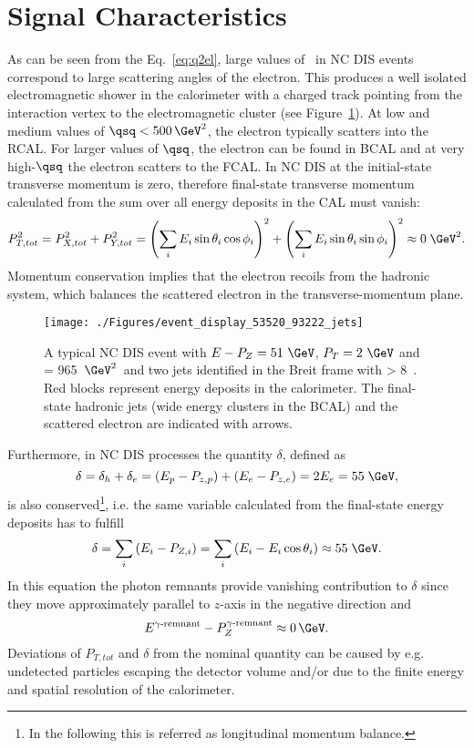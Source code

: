 \section{Signal Characteristics}
\label{sec:signalchar}
As can be seen from the Eq.~\eqref{eq:q2el}, large values of \qsq\, in NC DIS events correspond to large scattering angles of the electron. This produces a well isolated electromagnetic shower in the calorimeter with a charged track pointing from the interaction vertex to the electromagnetic cluster (see Figure~\ref{fig:ncdiseventdisplay}). At low and medium values of $\qsq < 500\, \GeV^2$, the electron typically scatters into the RCAL. For larger values of $\qsq$, the electron can be found in BCAL and at very high-$\qsq$ the electron scatters to the FCAL. In NC DIS at \hera the initial-state transverse momentum is zero, therefore final-state transverse momentum calculated from the sum over all energy deposits in the CAL must vanish:
\begin{equation}
P_{T,tot}^2 = P_{X,tot}^2+P_{Y,tot}^2 = \left(\sum_i{E_i\sin{\theta_i}\cos{\phi_i}}\right)^2 + \left(\sum_i{E_i\sin{\theta_i}\sin{\phi_i}}\right)^2 \approx 0\;\GeV^2.
\end{equation}
 Momentum conservation implies that the electron recoils from the hadronic system, which balances the scattered electron in the transverse-momentum plane.
\begin{figure}[htbp]
	\centering
	\texttt{[image: ./Figures/event\_display\_53520\_93222\_jets]} 
	\caption{A typical NC DIS event with $E-P_Z=51~\GeV$, $P_T=2~\GeV$ and \qsq = 965~$\GeV^2$~and two jets identified in the Breit frame with \etjetb> 8~\GeV. Red blocks represent energy deposits in the calorimeter. The final-state hadronic jets (wide energy clusters in the BCAL) and the scattered electron are indicated with arrows.}
	\label{fig:ncdiseventdisplay}
\end{figure}

Furthermore, in NC DIS processes the quantity $\delta$, defined as
\begin{equation}
\delta = \delta_h + \delta_e = \left( E_p - P_{z,p} \right) + \left( E_e - P_{z,e}\right) = 2E_e = 55\;\GeV,
\label{eq:deltadis}
\end{equation}
is also conserved\footnote{In the following this is referred as longitudinal momentum balance.}, i.e. the same variable calculated from the final-state energy deposits has to fulfill
\begin{equation}
\delta = \sum_i{\left(E_i - P_{Z,i}\right)} = \sum_i{\left(E_i - E_i\cos{\theta_i}\right)} \approx 55\;\GeV.
\end{equation}
In this equation the photon remnants provide vanishing contribution to $\delta$ since they move approximately parallel to $z$-axis in the negative direction and 
\begin{equation}
E^{\gamma\text{-remnant}}-P_{Z}^{\gamma\text{-remnant}} \approx 0\,\GeV.
\end{equation}
Deviations of $P_{T,tot}$ and $\delta$ from the nominal quantity can be caused by e.g. undetected particles escaping the  detector volume and/or due to the finite energy and spatial resolution of the calorimeter.

